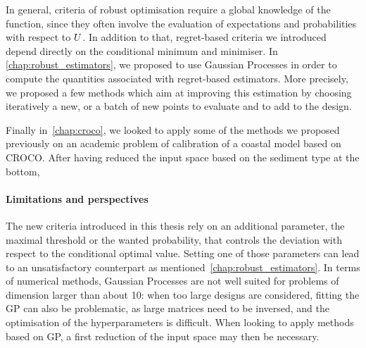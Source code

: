 \documentclass[../../Main_ManuscritThese.tex]{subfiles}
\begin{document}
In general, criteria of robust optimisation require a global
knowledge of the function, since they often involve the evaluation of
expectations and probabilities with respect to $U$. In addition to
that, regret-based criteria we introduced depend directly on the
conditional minimum and minimiser. In \cref{chap:robust_estimators},
we proposed to use Gaussian Processes in order to compute the
quantities associated with regret-based estimators. More precisely, we
proposed a few methods which aim at improving this estimation by
choosing iteratively a new, or a batch of new points to evaluate and
to add to the design.

Finally in~\cref{chap:croco}, we looked to apply some of the methods
we proposed previously on an academic problem of calibration of a
coastal model based on CROCO. After having reduced the input space
based on the sediment type at the bottom, 

\paragraph{Limitations and perspectives}
The new criteria introduced in this thesis rely on an additional
parameter, the maximal threshold or the wanted probability, that
controls the deviation with respect to the conditional optimal
value. Setting one of those parameters can lead to an unsatisfactory
counterpart as mentioned~\cref{chap:robust_estimators}.  In terms of
numerical methods, Gaussian Processes are not well suited for problems
of dimension larger than about \num{10}: when too large designs are
considered, fitting the GP can also be problematic, as large matrices
need to be inversed, and the optimisation of the hyperparameters is
difficult.  When looking to apply methods based on GP, a first
reduction of the input space may then be necessary.

\subfileLocal{
	\pagestyle{empty}
	
        
}

\end{document}
